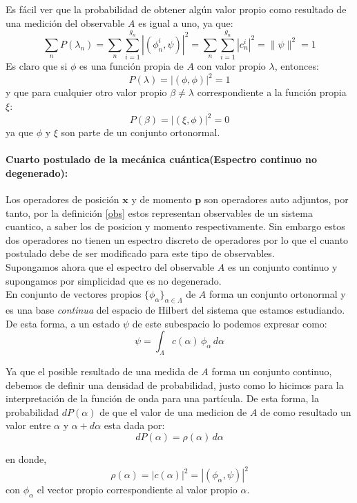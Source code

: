 \documentclass[12pt]{book}
\numberwithin{equation}{chapter}
\def\x{\mathbf{x}}
\def\P{\mathbf{p}}
\begin{document}
Es f\'acil ver que la probabilidad de obtener alg\'un valor propio como resultado de una medici\'on del observable $A$ es igual a uno, ya que:
$$ \sum_{n} P(\lambda_{n}) = \sum_{n} \sum_{i=1}^{g_{n}} |( \phi_{n}^{i},\psi )|^{2} = \sum_{n} \sum_{i=1}^{g_{n}} |c_{n}^{i}|^{2}= \| \psi \|^{2}=1 $$
Es claro que si $\phi$ es una funci\'on propia de $A$ con valor propio $\lambda$, entonces:
$$P(\lambda)= |(\phi,\phi)|^{2}=1$$
y que para cualquier otro valor propio $\beta \neq \lambda$ correspondiente a la funci\'on propia $\xi$:
$$ P(\beta)= |(\xi,\phi)|^{2}=0$$
ya que $\phi$ y $\xi$ son parte de un conjunto ortonormal.\\

\paragraph{Cuarto postulado de la mec\'anica cu\'antica(Espectro continuo no degenerado):}

Los operadores de posici\'on $\x$ y de momento $\P$ son operadores auto adjuntos, por tanto, por la definici\'on \ref{obs} estos representan observables de un sistema cuantico, a saber los de posicion y momento respectivamente. Sin embargo estos dos operadores no tienen un espectro discreto de operadores por lo que el cuanto postulado debe de ser modificado para este tipo de observables.\\ 

Supongamos ahora que el espectro del observable $A$ es un conjunto continuo y supongamos por simplicidad que es no degenerado.\\
En conjunto de vectores propios $\{ \phi_{\alpha} \}_{\alpha \in \Lambda} $ de $A$ forma un conjunto ortonormal y es una base \emph{continua} del espacio de Hilbert del sistema que estamos estudiando. De esta forma, a un estado $\psi$ de este subespacio lo podemos expresar como:
$$ \psi = \int_{\Lambda} c(\alpha) \, \phi_{\alpha} \, d\alpha $$

Ya que el posible resultado de una medida de $A$ forma un conjunto continuo, debemos de definir una densidad de probabilidad, justo como lo hicimos para la interpretaci\'on de la funci\'on de onda para una part\'icula. De esta forma, la probabilidad $dP(\alpha)$ de que el valor de una medicion de $A$ de como resultado un valor entre $\alpha$ y $\alpha + d \alpha$ esta dada por:
$$ dP(\alpha)= \rho(\alpha) \, d \alpha $$

en donde,
$$ \rho(\alpha) = |c(\alpha)|^{2} = | ( \phi_{\alpha},\psi ) |^{2} $$
con $\phi_{\alpha}$ el vector propio correspondiente al valor propio $\alpha$.\\
\end{document}
